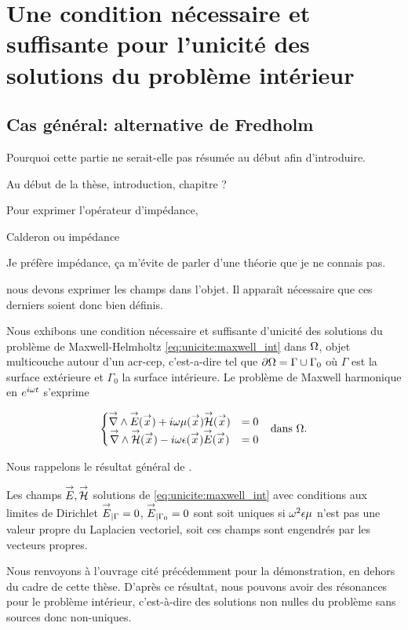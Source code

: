 \section{Une condition nécessaire et suffisante pour l'unicité des solutions du problème intérieur}
  \subsection{Cas général: alternative de Fredholm}

    \begin{REM}
      Pourquoi cette partie ne serait-elle pas résumée au début afin d'introduire.
    \end{REM}
    \begin{REP}
      Au début de la thèse, introduction, chapitre ?
    \end{REP}

    Pour exprimer l'opérateur d'impédance,
    \begin{REM}
      Calderon ou impédance
    \end{REM}
    \begin{REP}
      Je préfère impédance, ça m'évite de parler d'une théorie que je ne connais pas.
    \end{REP}
    nous devons exprimer les champs dans l'objet. Il apparaît nécessaire que ces derniers soient donc bien définis.

    Nous exhibons une condition nécessaire et suffisante d'unicité des solutions du problème de Maxwell-Helmholtz  \eqref{eq:unicite:maxwell_int} dans \(\Omega\), objet multicouche autour d'un \gls{acr-cep}, c'est-a-dire tel que \(\partial \Omega = \Gamma \cup \Gamma_0\) où \(\Gamma\) est la surface extérieure et \(\Gamma_0\) la surface intérieure. Le problème de Maxwell harmonique en \(e^{i\omega t}\) s'exprime

    \begin{align}
    \left\lbrace
      \begin{matrix}
        {\overset{\rightarrow}{\nabla}}\wedge {\overset{\rightarrow}{E}}({\overset{\rightarrow}{x}}) + i \omega\mu({\overset{\rightarrow}{x}}) {\overset{\rightarrow}{\mathcal{H}}}({\overset{\rightarrow}{x}}) &= 0
        \\
        {\overset{\rightarrow}{\nabla}}\wedge {\overset{\rightarrow}{\mathcal{H}}}({\overset{\rightarrow}{x}}) - i \omega\epsilon({\overset{\rightarrow}{x}}) {\overset{\rightarrow}{E}}({\overset{\rightarrow}{x}}) &= 0
      \end{matrix}
      \right. && \text{dans \(\Omega\).}
      \label{eq:unicite:maxwell_int}
    \end{align}

    Nous rappelons le résultat général de \cite[Théorème~8, p.~111]{cessenat_mathematical_1996}.
    \begin{thm}
      Les champs \({\overset{\rightarrow}{E}},{\overset{\rightarrow}{\mathcal{H}}}\) solutions de \eqref{eq:unicite:maxwell_int} avec conditions aux limites de Dirichlet \({\overset{\rightarrow}{E}}_{|\Gamma} = 0\), \({\overset{\rightarrow}{E}}_{|\Gamma_0} = 0\) sont soit uniques si \(\omega^2\epsilon\mu\) n'est pas une valeur propre du Laplacien vectoriel, soit ces champs sont engendrés par les vecteurs propres.
    \end{thm}
    Nous renvoyons à l'ouvrage cité précédemment pour la démonstration, en dehors du cadre de cette thèse.
    D'après ce résultat, nous pouvons avoir des résonances pour le problème intérieur, c'est-à-dire des solutions non nulles du problème sans sources donc non-uniques.

